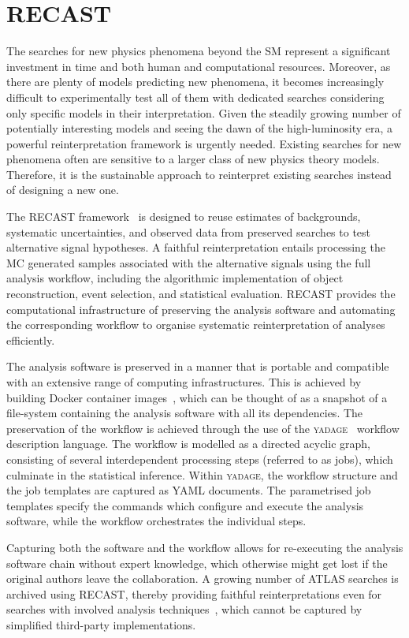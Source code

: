 \section{RECAST}
\label{sec:methods:recast}
The searches for new physics phenomena beyond the SM represent a significant investment in time and both human and computational resources. Moreover, as there are plenty of models predicting new phenomena, it becomes increasingly difficult to experimentally test all of them with dedicated searches considering only specific models in their interpretation.
Given the steadily growing number of potentially interesting models and seeing the dawn of the high-luminosity era, a powerful reinterpretation framework is urgently needed.
Existing searches for new phenomena often are sensitive to a larger class of new physics theory models. Therefore, it is the sustainable approach to reinterpret existing searches instead of designing a new one.

The RECAST framework~\cite{Cranmer2011} is designed to reuse estimates of backgrounds, systematic uncertainties, and observed data from preserved searches to test alternative signal hypotheses.
A faithful reinterpretation entails processing the MC generated samples associated with the alternative signals using the full analysis workflow, including the algorithmic implementation of object reconstruction, event selection, and statistical evaluation.
RECAST provides the computational infrastructure of preserving the analysis software and automating the corresponding workflow to organise systematic reinterpretation of analyses efficiently.

The analysis software is preserved in a manner that is portable and compatible with an extensive range of computing infrastructures. This is achieved by building Docker container images~\cite{Containers2014, Docker2014}, which can be thought of as a snapshot of a file-system containing the analysis software with all its dependencies.
The preservation of the workflow is achieved through the use of the \textsc{yadage}~\cite{Cranmer2017} workflow description language.
The workflow is modelled as a directed acyclic graph, consisting of several interdependent processing steps (referred to as jobs), which culminate in the statistical inference. Within \textsc{yadage}, the workflow structure and the job templates are captured as YAML documents. The parametrised job templates specify the commands which configure and execute the analysis software, while the workflow orchestrates the individual steps.

Capturing both the software and the workflow allows for re-executing the analysis software chain without expert knowledge, which otherwise might get lost if the original authors leave the collaboration.
A growing number of ATLAS searches is archived using RECAST, thereby providing faithful reinterpretations even for searches with involved analysis techniques~\cite{ATL-PHYS-PUB-2020-007}, which cannot be captured by simplified third-party implementations.
